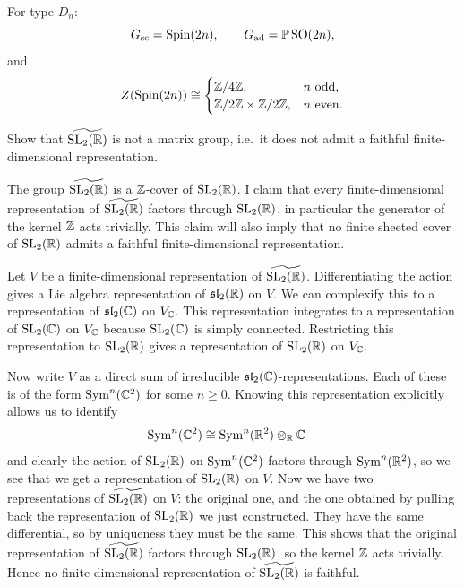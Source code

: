 \documentclass[12pt]{article}
\begin{document}
\begin{example}
    For type $D_n$:
    \[
        G_{\mathrm{sc}}=\operatorname{Spin}(2n),
        \qquad
        G_{\mathrm{ad}}=\mathbb{P} \operatorname{SO}(2n),
    \]
    and
    \[
        Z(\operatorname{Spin}(2n))\cong
        \begin{cases}
            \mathbb Z/4\mathbb Z,                            & n \text{ odd},  \\
            \mathbb Z/2\mathbb Z\times \mathbb Z/2\mathbb Z, & n \text{ even}.
        \end{cases}
    \]
\end{example}

\begin{exercise}
    Show that $\widetilde{\operatorname{SL}_2(\mathbb{R})}$ is not a matrix group, i.e.\ it does not admit a faithful finite-dimensional representation.
\end{exercise}

\begin{solution}
    The group $\widetilde{\operatorname{SL}_2(\mathbb{R})}$ is a $\mathbb{Z}$-cover of $\operatorname{SL}_2(\mathbb{R})$. I claim that every finite-dimensional representation of $\widetilde{\operatorname{SL}_2(\mathbb{R})}$ factors through $\operatorname{SL}_2(\mathbb{R})$, in particular the generator of the kernel $\mathbb{Z}$ acts trivially. This claim will also imply that no finite sheeted cover of $\operatorname{SL}_2(\mathbb{R})$ admits a faithful finite-dimensional representation.

    Let $V$ be a finite-dimensional representation of $\widetilde{\operatorname{SL}_2(\mathbb{R})}$. Differentiating the action gives a Lie algebra representation of $\mathfrak{sl}_2(\mathbb{R})$ on $V$. We can complexify this to a representation of $\mathfrak{sl}_2(\mathbb{C})$ on $V_{\mathbb{C}}$. This representation integrates to a representation of $\operatorname{SL}_2(\mathbb{C})$ on $V_{\mathbb{C}}$ because $\operatorname{SL}_2(\mathbb{C})$ is simply connected. Restricting this representation to $\operatorname{SL}_2(\mathbb{R})$ gives a representation of $\operatorname{SL}_2(\mathbb{R})$ on $V_{\mathbb{C}}$.

    Now write $V$ as a direct sum of irreducible $\mathfrak{sl}_2(\mathbb{C})$-representations. Each of these is of the form $\operatorname{Sym}^n(\mathbb{C}^2)$ for some $n\geq 0$. Knowing this representation explicitly allows us to identify \begin{align*}
        \operatorname{Sym}^n(\mathbb{C}^2) & \cong \operatorname{Sym}^n(\mathbb{R}^2)\otimes_{\mathbb{R}} \mathbb{C}
    \end{align*} and clearly the action of $\operatorname{SL}_2(\mathbb{R})$ on $\operatorname{Sym}^n(\mathbb{C}^2)$ factors through $\operatorname{Sym}^n(\mathbb{R}^2)$, so we see that we get a representation of $\operatorname{SL}_2(\mathbb{R})$ on $V$. Now we have two representations of $\widetilde{\operatorname{SL}_2(\mathbb{R})}$ on $V$: the original one, and the one obtained by pulling back the representation of $\operatorname{SL}_2(\mathbb{R})$ we just constructed. They have the same differential, so by uniqueness they must be the same. This shows that the original representation of $\widetilde{\operatorname{SL}_2(\mathbb{R})}$ factors through $\operatorname{SL}_2(\mathbb{R})$, so the kernel $\mathbb{Z}$ acts trivially. Hence no finite-dimensional representation of $\widetilde{\operatorname{SL}_2(\mathbb{R})}$ is faithful.
\end{solution}
\end{document}
